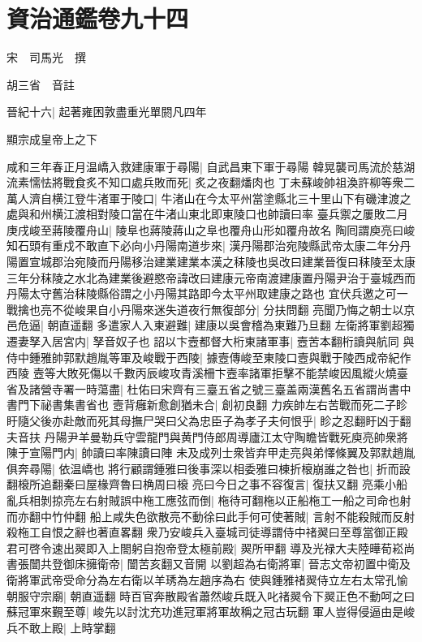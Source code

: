 \section{資治通鑑卷九十四}
宋　司馬光　撰

胡三省　音註

晉紀十六|{
	起著雍困敦盡重光單閼凡四年}


顯宗成皇帝上之下

咸和三年春正月温嶠入救建康軍于尋陽|{
	自武昌東下軍于尋陽}
韓晃襲司馬流於慈湖流素懦怯將戰食炙不知口處兵敗而死|{
	炙之夜翻燔肉也}
丁未蘇峻帥祖渙許柳等衆二萬人濟自横江登牛渚軍于陵口|{
	牛渚山在今太平州當塗縣北三十里山下有磯津渡之處與和州横江渡相對陵口當在牛渚山東北即東陵口也帥讀曰率}
臺兵禦之屢敗二月庚戌峻至蔣陵覆舟山|{
	陵阜也蔣陵蔣山之阜也覆舟山形如覆舟故名}
陶囘謂庾亮曰峻知石頭有重戍不敢直下必向小丹陽南道步來|{
	漢丹陽郡治宛陵縣武帝太康二年分丹陽置宣城郡治宛陵而丹陽移治建業建業本漢之秣陵也吳改曰建業晉復曰秣陵至太康三年分秣陵之水北為建業後避愍帝諱改曰建康元帝南渡建康置丹陽尹治于臺城西而丹陽太守舊治秣陵縣俗謂之小丹陽其路即今太平州取建康之路也}
宜伏兵邀之可一戰擒也亮不從峻果自小丹陽來迷失道夜行無復部分|{
	分扶問翻}
亮聞乃悔之朝士以京邑危逼|{
	朝直遥翻}
多遣家人入東避難|{
	建康以吳會稽為東難乃旦翻}
左衛將軍劉超獨遷妻孥入居宮内|{
	孥音奴子也}
詔以卞壼都督大桁東諸軍事|{
	壼苦本翻桁讀與航同}
與侍中鍾雅帥郭默趙胤等軍及峻戰于西陵|{
	據壼傳峻至東陵口壼與戰于陵西成帝紀作西陵}
壼等大敗死傷以千數丙辰峻攻青溪柵卞壼率諸軍拒擊不能禁峻因風縱火燒臺省及諸營寺署一時蕩盡|{
	杜佑曰宋齊有三臺五省之號三臺盖兩漢舊名五省謂尚書中書門下祕書集書省也}
壼背癰新愈創猶未合|{
	創初良翻}
力疾帥左右苦戰而死二子眕盱隨父後亦赴敵而死其母撫尸哭曰父為忠臣子為孝子夫何恨乎|{
	眕之忍翻盱凶于翻夫音扶}
丹陽尹羊曼勒兵守雲龍門與黄門侍郎周導廬江太守陶瞻皆戰死庾亮帥衆將陳于宣陽門内|{
	帥讀曰率陳讀曰陣}
未及成列士衆皆弃甲走亮與弟懌條翼及郭默趙胤俱奔尋陽|{
	依温嶠也}
將行顧謂鍾雅曰後事深以相委雅曰棟折榱崩誰之咎也|{
	折而設翻榱所追翻秦曰屋椽齊魯曰桷周曰榱}
亮曰今日之事不容復言|{
	復扶又翻}
亮乘小船亂兵相剝掠亮左右射賊誤中柂工應弦而倒|{
	柂待可翻柂以正船柂工一船之司命也射而亦翻中竹仲翻}
船上咸失色欲散亮不動徐曰此手何可使著賊|{
	言射不能殺賊而反射殺柂工自恨之辭也著直畧翻}
衆乃安峻兵入臺城司徒導謂侍中禇翜曰至尊當御正殿君可啓令速出翜即入上閤躬自抱帝登太極前殿|{
	翜所甲翻}
導及光禄大夫陸曄荀崧尚書張闓共登御床擁衛帝|{
	闓苦亥翻又音開}
以劉超為右衛將軍|{
	晉志文帝初置中衛及衛將軍武帝受命分為左右衛以羊琇為左趙序為右}
使與鍾雅禇翜侍立左右太常孔愉朝服守宗廟|{
	朝直遥翻}
時百官奔散殿省蕭然峻兵既入叱禇翜令下翜正色不動呵之曰蘇冠軍來覲至尊|{
	峻先以討沈充功進冠軍將軍故稱之冠古玩翻}
軍人豈得侵逼由是峻兵不敢上殿|{
	上時掌翻}
